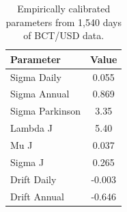 \begin{table}[t]
\centering
\footnotesize
\begin{tabular}{l c}
\hline
Parameter & Value \\
\hline
Sigma Daily & 0.055 \\
Sigma Annual & 0.869 \\
Sigma Parkinson & 3.35 \\
Lambda J & 5.40 \\
Mu J & 0.037 \\
Sigma J & 0.265 \\
Drift Daily & -0.003 \\
Drift Annual & -0.646 \\
\hline
\end{tabular}
\caption{Empirically calibrated parameters from 1,540 days of BCT/USD data.}
\label{tab:empirical_calibration}
\end{table}
